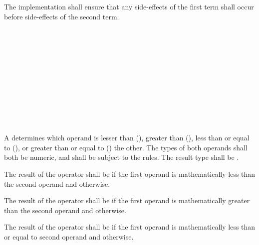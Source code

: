 \specsubsubitem
The implementation shall ensure that any side-effects of the first term shall
occur before side-effects of the second term.


\begin{grammar}
 \\
	 \\
	 \terminal{<}  \\
	 \terminal{>}  \\
	 \terminal{<=}  \\
	 \terminal{>=}  \\

 \\
	 \\
	 \terminal{==}  \\
	 \terminal{!=}  \\
\end{grammar}

\specsubsubitem
A  determines which operand is lesser than
(\terminal{<}), greater than (\terminal{>}), less than or equal to
(\terminal{<=}), or greater than or equal to (\terminal{>=}) the other. The
types of both operands shall both be numeric, and shall be subject to the
 rules. The result type shall be .

\specsubsubitem
The result of the \terminal{<} operator shall be  if the first
operand is mathematically less than the second operand and 
otherwise.

\specsubsubitem
The result of the \terminal{>} operator shall be  if the first
operand is mathematically greater than the second operand and 
otherwise.

\specsubsubitem
The result of the \terminal{<=} operator shall be  if the
first operand is mathematically less than or equal to second operand
and  otherwise.

